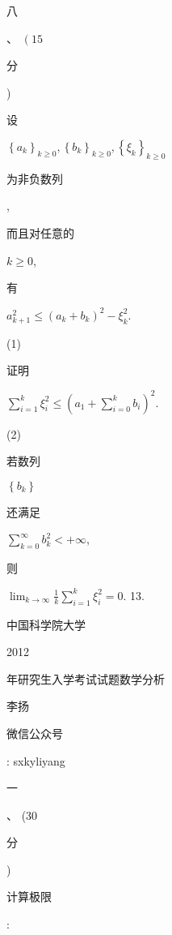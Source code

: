 \documentclass[10pt]{article}
\begin{document}
\begin{CJK}{UTF8}{mj}八\end{CJK}、 $\left(15\right.$ \begin{CJK}{UTF8}{mj}分\end{CJK}) \begin{CJK}{UTF8}{mj}设\end{CJK} $\left\{a_{k}\right\}_{k \geq 0},\left\{b_{k}\right\}_{k \geq 0},\left\{\xi_{k}\right\}_{k \geq 0}$ \begin{CJK}{UTF8}{mj}为非负数列\end{CJK}, \begin{CJK}{UTF8}{mj}而且对任意的\end{CJK} $k \geq 0$, \begin{CJK}{UTF8}{mj}有\end{CJK} $a_{k+1}^{2} \leq\left(a_{k}+b_{k}\right)^{2}-\xi_{k}^{2}$.

(1) \begin{CJK}{UTF8}{mj}证明\end{CJK} $\sum_{i=1}^{k} \xi_{i}^{2} \leq\left(a_{1}+\sum_{i=0}^{k} b_{i}\right)^{2}$.

(2) \begin{CJK}{UTF8}{mj}若数列\end{CJK} $\left\{b_{k}\right\}$ \begin{CJK}{UTF8}{mj}还满足\end{CJK} $\sum_{k=0}^{\infty} b_{k}^{2}<+\infty$, \begin{CJK}{UTF8}{mj}则\end{CJK} $\lim _{k \rightarrow \infty} \frac{1}{k} \sum_{i=1}^{k} \xi_{i}^{2}=0$. 13. \begin{CJK}{UTF8}{mj}中国科学院大学\end{CJK} 2012 \begin{CJK}{UTF8}{mj}年研究生入学考试试题数学分析\end{CJK}

\begin{CJK}{UTF8}{mj}李扬\end{CJK}

\begin{CJK}{UTF8}{mj}微信公众号\end{CJK}: sxkyliyang

\begin{CJK}{UTF8}{mj}一\end{CJK}、 (30 \begin{CJK}{UTF8}{mj}分\end{CJK}) \begin{CJK}{UTF8}{mj}计算极限\end{CJK}:
\end{document}
